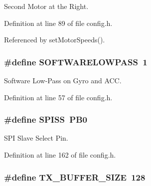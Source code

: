 Second Motor at the Right. 



Definition at line 89 of file config.\-h.



Referenced by set\-Motor\-Speeds().

\hypertarget{group__config_gaba06e7be57726e74f267a1622e7d720e}{
\subsubsection[{S\-O\-F\-T\-W\-A\-R\-E\-L\-O\-W\-P\-A\-S\-S}]{\setlength{\rightskip}{0pt plus 5cm}\#define S\-O\-F\-T\-W\-A\-R\-E\-L\-O\-W\-P\-A\-S\-S~1}}\label{group__config_gaba06e7be57726e74f267a1622e7d720e}


Software Low-\/\-Pass on Gyro and A\-C\-C. 



Definition at line 57 of file config.\-h.

\hypertarget{group__config_gab652052c0495e4b720b52cdcf83f535d}{
\subsubsection[{S\-P\-I\-S\-S}]{\setlength{\rightskip}{0pt plus 5cm}\#define S\-P\-I\-S\-S~P\-B0}}\label{group__config_gab652052c0495e4b720b52cdcf83f535d}


S\-P\-I Slave Select Pin. 



Definition at line 162 of file config.\-h.

\hypertarget{group__config_ga9ab33647617098646990fe263600b650}{
\subsubsection[{T\-X\-\_\-\-B\-U\-F\-F\-E\-R\-\_\-\-S\-I\-Z\-E}]{\setlength{\rightskip}{0pt plus 5cm}\#define T\-X\-\_\-\-B\-U\-F\-F\-E\-R\-\_\-\-S\-I\-Z\-E~128}}\label{group__config_ga9ab33647617098646990fe263600b650}


